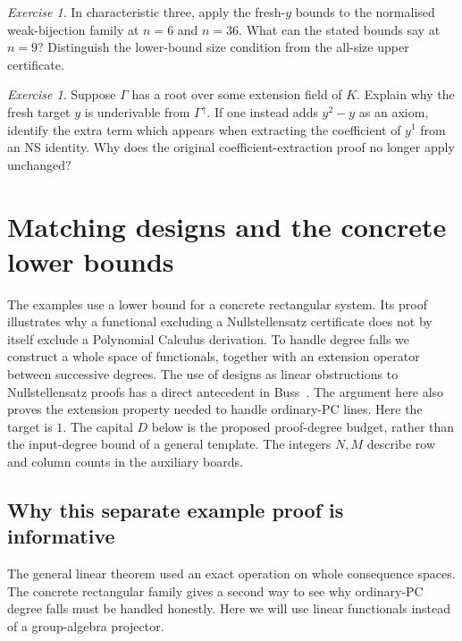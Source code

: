 \documentclass[11pt,a4paper,oneside,openany]{book}
\theoremstyle{definition}\newtheorem{definition}[theorem]{Definition}
\theoremstyle{remark}\newtheorem{remark}[theorem]{Remark}
\newtheorem{exercise}[theorem]{Exercise}
\numberwithin{equation}{chapter}
\begin{document}
\begin{exercise}\label{tx:ex:fresh-window}
In characteristic three, apply the fresh-$y$ bounds to the normalised
weak-bijection family at $n=6$ and $n=36$. What can the stated bounds
say at $n=9$? Distinguish the lower-bound size condition from the
all-size upper certificate.
\end{exercise}
\par\medskip

\begin{exercise}\label{tx:ex:fresh-soundness}
Suppose $\Gamma$ has a root over some extension field of $K$. Explain
why the fresh target $y$ is underivable from $\Gamma^\uparrow$.
If one instead adds $y^2-y$ as an axiom, identify the extra term which
appears when extracting the coefficient of $y^1$ from an NS identity.
Why does the original coefficient-extraction proof no longer apply
unchanged?
\end{exercise}
\par\medskip


\chapter{Matching designs and the concrete lower bounds}
\label{tx:app:matching}

The examples use a lower bound for a concrete rectangular system.  Its
proof illustrates why a functional excluding a Nullstellensatz certificate
does not by itself exclude a Polynomial Calculus derivation.  To handle
degree falls we construct a whole space of functionals, together with an
extension operator between successive degrees.
The use of designs as linear obstructions to Nullstellensatz proofs
has a direct antecedent in Buss~\cite{BussDesign}. The argument here
also proves the extension property needed to handle ordinary-PC lines.
Here the target is $1$. The capital $D$ below is the proposed proof-degree
budget, rather than the input-degree bound of a general template.
The integers $N,M$ describe row and column counts in the auxiliary boards.

\section{Why this separate example proof is informative}
The general linear theorem used an exact operation on whole consequence
spaces. The concrete rectangular family gives a second way to see why
ordinary-PC degree falls must be handled honestly. Here we will use
linear functionals instead of a group-algebra projector.
\end{document}
